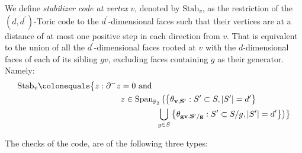 \begin{definition}
We define \textit{stabilizer code at vertex} $v$, denoted by $\text{Stab}_{v}$, as the restriction of the $(d,d^{\prime})$-Toric code to the $d^{\prime}$-dimensional faces such that their vertices are at a distance of at most one positive step in each direction from $v$. That is equivalent to the union of all the $d^{\prime}$-dimensional faces rooted at $v$ with the $d$-dimensional faces of each of its sibling $gv$, excluding faces containing $g$ as their generator. Namely:
  \begin{align*}
    \text{Stab}_{v} \colonequals  \bigl\{ z : \partial^{-} z  &= 0 \text{ and } \\
    & z \in \operatorname{Span}_{\mathbb F_2} \big(  \big\{  \rotfvs{} : S^{\prime} \subset S, |S^{\prime}| = d^{\prime}  \big\} \\
   & \ \ \ \ \ \ \ \ \ \ \ \ \  \bigcup_{g \in S} \big\{ \rotfv{gv}{S^{\prime}/g} : S^{\prime} \subset S/g , |S^{\prime}|=d^{\prime} \big\} \big) \bigr\}
  \end{align*}
\end{definition}
The checks of the code, are of the following three types: 
